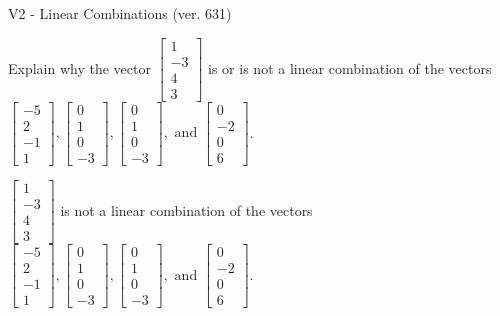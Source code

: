 \begin{exercise}
  \begin{exerciseTitle}V2 - Linear Combinations (ver. 631)\end{exerciseTitle}
  \begin{exerciseStatement}
    Explain why the vector \(\left[\begin{array}{c}
1 \\
-3 \\
4 \\
3
\end{array}\right]\)  is or is not a linear 
	combination of the vectors \(\left[\begin{array}{c}
-5 \\
2 \\
-1 \\
1
\end{array}\right] , \left[\begin{array}{c}
0 \\
1 \\
0 \\
-3
\end{array}\right] , \left[\begin{array}{c}
0 \\
1 \\
0 \\
-3
\end{array}\right] , \text{ and } \left[\begin{array}{c}
0 \\
-2 \\
0 \\
6
\end{array}\right]\).
	


  \end{exerciseStatement}
  \begin{exerciseAnswer}
   \(\left[\begin{array}{c}
1 \\
-3 \\
4 \\
3
\end{array}\right]\) 
  	 is not  
	a linear combination of the vectors \(\left[\begin{array}{c}
-5 \\
2 \\
-1 \\
1
\end{array}\right] , \left[\begin{array}{c}
0 \\
1 \\
0 \\
-3
\end{array}\right] , \left[\begin{array}{c}
0 \\
1 \\
0 \\
-3
\end{array}\right] , \text{ and } \left[\begin{array}{c}
0 \\
-2 \\
0 \\
6
\end{array}\right]\).


\end{exerciseAnswer}
\end{exercise}
